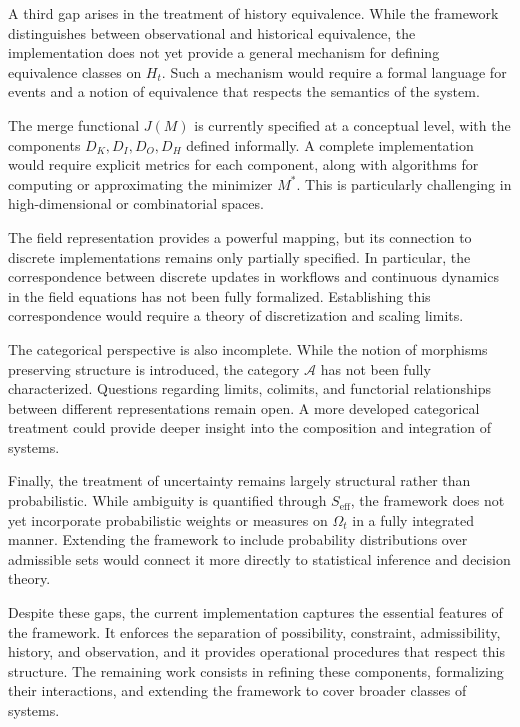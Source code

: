 \documentclass[11pt,oneside]{article}
\begin{document}
A third gap arises in the treatment of history equivalence. While the framework distinguishes between observational and historical equivalence, the implementation does not yet provide a general mechanism for defining equivalence classes on \( H_t \). Such a mechanism would require a formal language for events and a notion of equivalence that respects the semantics of the system.

The merge functional \( J(M) \) is currently specified at a conceptual level, with the components \( D_K, D_I, D_O, D_H \) defined informally. A complete implementation would require explicit metrics for each component, along with algorithms for computing or approximating the minimizer \( M^\ast \). This is particularly challenging in high-dimensional or combinatorial spaces.

The field representation provides a powerful mapping, but its connection to discrete implementations remains only partially specified. In particular, the correspondence between discrete updates in workflows and continuous dynamics in the field equations has not been fully formalized. Establishing this correspondence would require a theory of discretization and scaling limits.

The categorical perspective is also incomplete. While the notion of morphisms preserving structure is introduced, the category \( \mathcal{A} \) has not been fully characterized. Questions regarding limits, colimits, and functorial relationships between different representations remain open. A more developed categorical treatment could provide deeper insight into the composition and integration of systems.

Finally, the treatment of uncertainty remains largely structural rather than probabilistic. While ambiguity is quantified through \( S_{\mathrm{eff}} \), the framework does not yet incorporate probabilistic weights or measures on \( \Omega_t \) in a fully integrated manner. Extending the framework to include probability distributions over admissible sets would connect it more directly to statistical inference and decision theory.

Despite these gaps, the current implementation captures the essential features of the framework. It enforces the separation of possibility, constraint, admissibility, history, and observation, and it provides operational procedures that respect this structure. The remaining work consists in refining these components, formalizing their interactions, and extending the framework to cover broader classes of systems.
\end{document}
